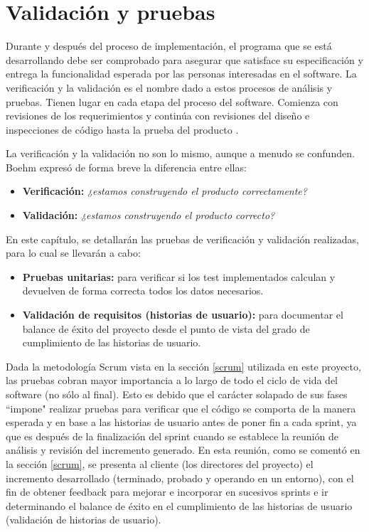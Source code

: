 \chapter{Validación y pruebas}
Durante y después del proceso de implementación, el programa que se está desarrollando debe ser comprobado para asegurar que satisface su especificación y entrega la funcionalidad esperada por las personas interesadas en el software. La verificación y la validación es el nombre dado a estos procesos de análisis y pruebas. Tienen lugar en cada etapa del proceso del software. Comienza con revisiones de los requerimientos y continúa con revisiones del diseño e inspecciones de código hasta la prueba del producto \cite{sommerville}.

La verificación y la validación no son lo mismo, aunque a menudo se confunden. Boehm \cite{boehm} expresó de forma breve la diferencia entre ellas:

\begin{itemize}
\item \textbf{Verificación:} \textit{¿estamos construyendo el producto correctamente?}
\item \textbf{Validación:} \textit{¿estamos construyendo el producto correcto?}
\end{itemize}

En este capítulo, se detallarán las pruebas de verificación y validación realizadas, para lo cual se llevarán a cabo:
\begin{itemize}
\item \textbf{Pruebas unitarias:} para verificar si los test implementados calculan y devuelven de forma correcta todos los datos necesarios.
\item \textbf{Validación de requisitos (historias de usuario):} para documentar el balance de éxito del proyecto desde el punto de vista del grado de cumplimiento de las historias de usuario.
\end{itemize}

Dada la metodología Scrum vista en la sección \ref{scrum} utilizada en este proyecto, las pruebas cobran mayor importancia a lo largo de todo el ciclo de vida del software (no sólo al final). Esto es debido que el carácter solapado de sus fases ``impone" \space realizar pruebas para verificar que el código se comporta de la manera esperada y en base a las historias de usuario antes de poner fin a cada sprint, ya que es después de la finalización del sprint cuando se establece la reunión de análisis y revisión del incremento generado. En esta reunión, como se comentó en la sección \ref{scrum}, se presenta al cliente (los directores del proyecto) el incremento desarrollado (terminado, probado y operando en un entorno), con el fin de obtener feedback para mejorar e incorporar en sucesivos sprints e ir determinando el balance de éxito en el cumplimiento de las historias de usuario (validación de historias de usuario).

